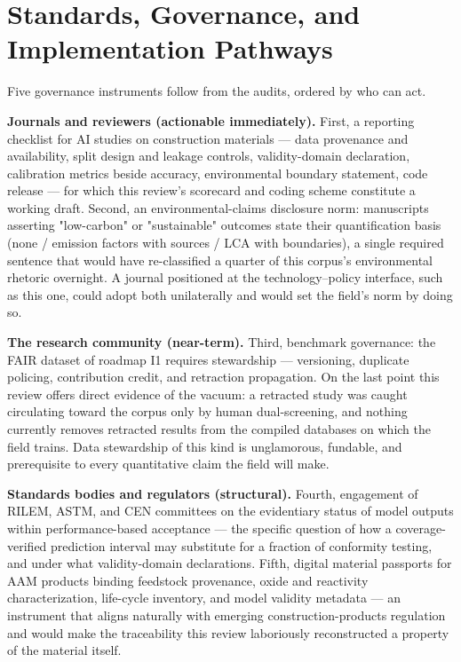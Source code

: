 \documentclass[pdflatex,sn-basic]{sn-jnl}
\begin{document}
\section{Standards, Governance, and Implementation Pathways}

Five governance instruments follow from the audits, ordered by who can act.

\textbf{Journals and reviewers (actionable immediately).} First, a reporting checklist for AI studies on construction materials --- data provenance and availability, split design and leakage controls, validity-domain declaration, calibration metrics beside accuracy, environmental boundary statement, code release --- for which this review's scorecard and coding scheme constitute a working draft. Second, an environmental-claims disclosure norm: manuscripts asserting "low-carbon" or "sustainable" outcomes state their quantification basis (none / emission factors with sources / LCA with boundaries), a single required sentence that would have re-classified a quarter of this corpus's environmental rhetoric overnight. A journal positioned at the technology--policy interface, such as this one, could adopt both unilaterally and would set the field's norm by doing so.

\textbf{The research community (near-term).} Third, benchmark governance: the FAIR dataset of roadmap I1 requires stewardship --- versioning, duplicate policing, contribution credit, and retraction propagation. On the last point this review offers direct evidence of the vacuum: a retracted study was caught circulating toward the corpus only by human dual-screening, and nothing currently removes retracted results from the compiled databases on which the field trains. Data stewardship of this kind is unglamorous, fundable, and prerequisite to every quantitative claim the field will make.

\textbf{Standards bodies and regulators (structural).} Fourth, engagement of RILEM, ASTM, and CEN committees on the evidentiary status of model outputs within performance-based acceptance --- the specific question of how a coverage-verified prediction interval may substitute for a fraction of conformity testing, and under what validity-domain declarations. Fifth, digital material passports for AAM products binding feedstock provenance, oxide and reactivity characterization, life-cycle inventory, and model validity metadata --- an instrument that aligns naturally with emerging construction-products regulation and would make the traceability this review laboriously reconstructed a property of the material itself.
\end{document}
